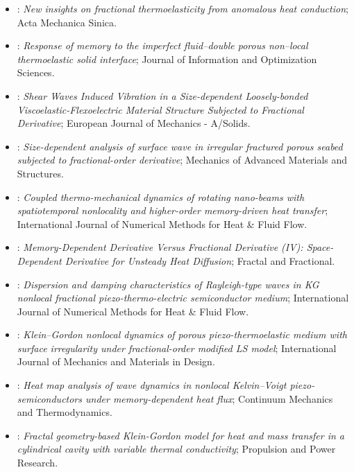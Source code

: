 \begin{itemize}
\item \citet{Yu2024}: \emph{New insights on fractional thermoelasticity from anomalous heat conduction}; Acta Mechanica Sinica.
\item \citet{Kumar2025}: \emph{Response of memory to the imperfect fluid–double porous non–local thermoelastic solid interface}; Journal of Information and Optimization Sciences.
\item \citet{Meghana2025}: \emph{Shear Waves Induced Vibration in a Size-dependent Loosely-bonded Viscoelastic-Flexoelectric Material Structure Subjected to Fractional Derivative}; European Journal of Mechanics - A/Solids.
\item \citet{Meghana2025a}: \emph{Size-dependent analysis of surface wave in irregular fractured porous seabed subjected to fractional-order derivative}; Mechanics of Advanced Materials and Structures.
\item \citet{Sur2025}: \emph{Coupled thermo-mechanical dynamics of rotating nano-beams with spatiotemporal nonlocality and higher-order memory-driven heat transfer}; International Journal of Numerical Methods for Heat \& Fluid Flow.
\item \citet{WangLi2025IV}: \emph{Memory-Dependent Derivative Versus Fractional Derivative (IV): Space-Dependent Derivative for Unsteady Heat Diffusion}; Fractal and Fractional.
\item \citet{Aldandani2026}: \emph{Dispersion and damping characteristics of Rayleigh-type waves in KG nonlocal fractional piezo-thermo-electric semiconductor medium}; International Journal of Numerical Methods for Heat \& Fluid Flow.
\item \citet{Das2026}: \emph{Klein–Gordon nonlocal dynamics of porous piezo-thermoelastic medium with surface irregularity under fractional-order modified LS model}; International Journal of Mechanics and Materials in Design.
\item \citet{Gupta2026HeatMap}: \emph{Heat map analysis of wave dynamics in nonlocal Kelvin–Voigt piezo-semiconductors under memory-dependent heat flux}; Continuum Mechanics and Thermodynamics.
\item \citet{Sur2026}: \emph{Fractal geometry-based Klein-Gordon model for heat and mass transfer in a cylindrical cavity with variable thermal conductivity}; Propulsion and Power Research.
\end{itemize}
